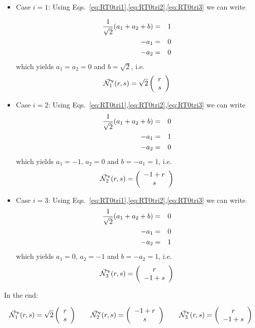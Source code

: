 \begin{itemize}
\item Case $i=1$: Using Eqs.~\eqref{eq:RT0tri1},\eqref{eq:RT0tri2},\eqref{eq:RT0tri3} we can write

\begin{eqnarray}
\frac{1}{\sqrt 2}  (a_1 + a_2+b)  &=&  1 \nonumber\\
-a_1 &=& 0 \nonumber\\
-a_2 &=& 0 \nonumber
\end{eqnarray}
which yields $a_1=a_2=0$ and $b=\sqrt 2$, i.e.
\[
\vec{{\mathcal{N}}}^\upnu_1 (r,s) = \sqrt 2
\left(
\begin{array}{c}
r \\ s
\end{array}
\right)
\]

\item Case $i=2$: Using Eqs.~\eqref{eq:RT0tri1},\eqref{eq:RT0tri2},\eqref{eq:RT0tri3} we can write
\begin{eqnarray}
\frac{1}{\sqrt 2}  (a_1 + a_2+b)  &=&  0 \nonumber\\
-a_1 &=& 1 \nonumber\\
-a_2 &=& 0 \nonumber
\end{eqnarray}
which yields $a_1=-1$, $a_2=0$ and $b=-a_1=1$, i.e.
\[
\vec{{\mathcal{N}}}^\upnu_2 (r,s) =
\left(
\begin{array}{c}
-1 +r \\ s
\end{array}
\right)
\]


\item Case $i=3$: Using Eqs.~\eqref{eq:RT0tri1},\eqref{eq:RT0tri2},\eqref{eq:RT0tri3} we can write
\begin{eqnarray}
\frac{1}{\sqrt 2}  (a_1 + a_2+b)  &=&  0 \nonumber\\
-a_1 &=& 0 \nonumber\\
-a_2 &=& 1 \nonumber
\end{eqnarray}
which yields $a_1=0$, $a_2=-1$ and $b=-a_2=1$, i.e.
\[
\vec{{\mathcal{N}}}^\upnu_3 (r,s) =
\left(
\begin{array}{c}
 r \\ -1 +  s
\end{array}
\right)
\]

\end{itemize}


In the end:
\begin{mdframed}[backgroundcolor=blue!5]
\[
\vec{{\mathcal{N}}}^\upnu_1 (r,s) = \sqrt 2
\left(
\begin{array}{c}
r \\ s
\end{array}
\right)
\qquad
\vec{{\mathcal{N}}}^\upnu_2 (r,s) =
\left(
\begin{array}{c}
-1 +r \\ s
\end{array}
\right)
\qquad
\vec{{\mathcal{N}}}^\upnu_3 (r,s) =
\left(
\begin{array}{c}
 r \\ -1 +  s
\end{array}
\right)
\]
\end{mdframed}


